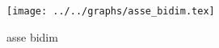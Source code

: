 \begin{figure}[h] \centering\texttt{[image: ../../graphs/asse\_bidim.tex]}\caption{asse bidim}\label{gr:asse_bidim} \end{figure}
